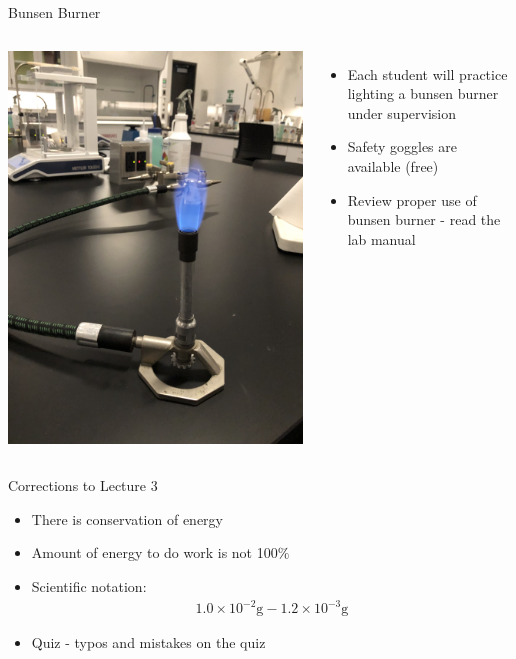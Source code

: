 \documentclass[11pt]{beamer}
\begin{document}
\begin{frame}{Bunsen Burner}
  \begin{columns}
    \centering
    \includegraphics[angle=-90,scale=0.05]{bunsen_burn}

    \begin{itemize}
    \item Each student will practice lighting a
      bunsen burner under supervision
    \item Safety goggles are available (free)
    \item Review proper use of bunsen burner -
      read the lab manual
    \end{itemize}
  \end{columns}
\end{frame}

\begin{frame}{Corrections to Lecture 3}
  \begin{itemize}
  \item There is conservation of energy
  \item Amount of energy to do work is not 100$\%$
  \item Scientific notation:
    \begin{align}
      1.0\times 10^{-2}\text{g} - 1.2\times 10^{-3}\text{g}
    \end{align}
  \item Quiz - typos and mistakes on the quiz
  \end{itemize}
\end{frame}
\end{document}
